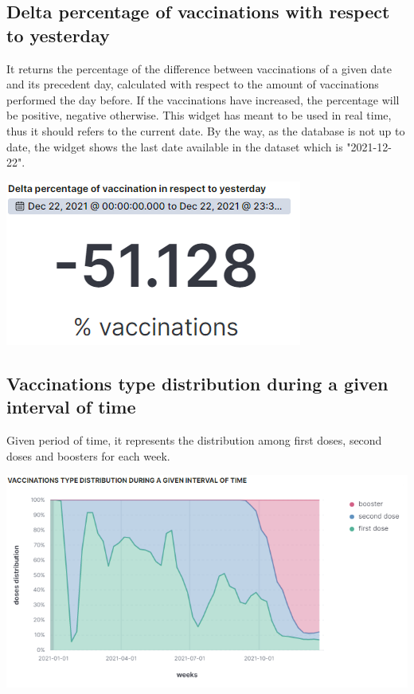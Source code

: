\documentclass{article}
\begin{document}
\subsection{Delta percentage of vaccinations with respect to yesterday}
It returns the percentage of the difference between vaccinations of a given date and its precedent day, calculated with respect to the amount of vaccinations performed the day before.
If the vaccinations have increased, the percentage will be positive, negative otherwise.
This widget has meant to be used in real time, thus it should refers to the current date. By the way, as the database is not up to date, the widget shows the last date available in the dataset which is "2021-12-22".

\begin{center}
\includegraphics[scale=0.6]{delta_perc.png}
\end{center}

\subsection{Vaccinations type distribution during a given interval of time}
Given period of time, it represents the distribution among first doses, second doses and boosters for each week.

\begin{center}
\includegraphics[scale=0.6]{vacc_distr.png}
\end{center}
\end{document}
